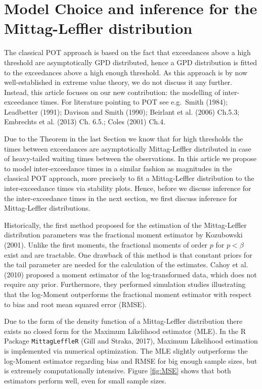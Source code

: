 \documentclass[]{elsarticle} %
\begin{document}
\hypertarget{sec:ML}{%
\section{Model Choice and inference for the Mittag-Leffler
distribution}\label{sec:ML}}

The classical POT approach is based on the fact that exceedances above a
high threshold are asymptotically GPD distributed, hence a GPD
distribution is fitted to the exceedances above a high enough threshold.
As this approach is by now well-established in extreme value theory, we
do not discuss it any further. Instead, this article focuses on our new
contribution: the modelling of inter-exceedance times. For literature
pointing to POT see e.g.~Smith (1984); Leadbetter (1991); Davison and
Smith (1990); Beirlant et al. (2006) Ch.5.3; Embrechts et al. (2013) Ch.
6.5.; Coles (2001) Ch.4.

Due to the Theorem in the last Section we know that for high thresholds
the times between exceedances are asymptotically Mittag-Leffler
distributed in case of heavy-tailed waiting times between the
observations. In this article we propose to model inter-exceedance times
in a similar fashion as magnitudes in the classical POT approach, more
precisely to fit a Mittag-Leffler distribution to the inter-exceedance
times via stability plots. Hence, before we discuss inference for the
inter-exceedance times in the next section, we first discuss inference
for Mittag-Leffler distributions.

Historically, the first method proposed for the estimation of the
Mittag-Leffler distribution parameters was the fractional moment
estimator by Kozubowski (2001). Unlike the first moments, the fractional
moments of order \(p\) for \(p<\beta\) exist and are tractable. One
drawback of this method is that constant priors for the tail parameter
are needed for the calculation of the estimates. Cahoy et al. (2010)
proposed a moment estimator of the log-transformed data, which does not
require any prior. Furthermore, they performed simulation studies
illustrating that the log-Moment outperforms the fractional moment
estimator with respect to bias and root mean squared error (RMSE).

Due to the form of the density function of a Mittag-Leffler distribution
there exists no closed form for the Maximum Likelihood estimator (MLE).
In the R Package \texttt{MittagLeffleR} (Gill and Straka, 2017), Maximum
Likelihood estimation is implemented via numerical optimization. The MLE
slightly outperforms the log-Moment estimator regarding bias and RMSE
for big enough sample sizes, but is extremely computationally intensive.
Figure \ref{fig:MSE} shows that both estimators perform well, even for
small sample sizes.
\end{document}
